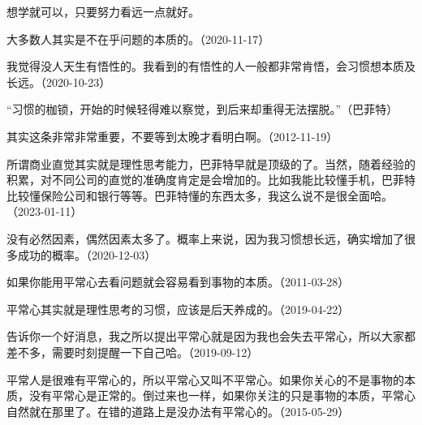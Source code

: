 想学就可以，只要努力看远一点就好。

大多数人其实是不在乎问题的本质的。（2020-11-17）


我觉得没人天生有悟性的。我看到的有悟性的人一般都非常肯悟，会习惯想本质及长远。（2020-10-23）

“习惯的枷锁，开始的时候轻得难以察觉，到后来却重得无法摆脱。”（巴菲特）

其实这条非常非常重要，不要等到太晚才看明白啊。（2012-11-19）


所谓商业直觉其实就是理性思考能力，巴菲特早就是顶级的了。当然，随着经验的积累，对不同公司的直觉的准确度肯定是会增加的。比如我能比较懂手机，巴菲特比较懂保险公司和银行等等。巴菲特懂的东西太多，我这么说不是很全面哈。（2023-01-11）


没有必然因素，偶然因素太多了。概率上来说，因为我习惯想长远，确实增加了很多成功的概率。（2020-12-03）


如果你能用平常心去看问题就会容易看到事物的本质。（2011-03-28）


平常心其实就是理性思考的习惯，应该是后天养成的。（2019-04-22）


告诉你一个好消息，我之所以提出平常心就是因为我也会失去平常心，所以大家都差不多，需要时刻提醒一下自己哈。（2019-09-12）

平常人是很难有平常心的，所以平常心又叫不平常心。如果你关心的不是事物的本质，没有平常心是正常的。倒过来也一样，如果你关注的只是事物的本质，平常心自然就在那里了。在错的道路上是没办法有平常心的。（2015-05-29）
